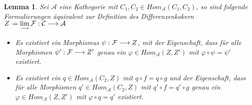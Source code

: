 \documentclass[10pt,a4paper]{report}
\newcounter{Aussage}[chapter]
\newtheorem{lemma}[Aussage]{Lemma}
\newcommand{\functionfront}[3]{\nolinebreak{#1:#2 \longrightarrow #3}}
\newcommand{\colimes}[0]{\lim\limits_{ \longrightarrow }}
\newcommand*{\defeq}{\mathrel{\vcenter{\baselineskip0.5ex \lineskiplimit0pt
                     \hbox{\scriptsize.}\hbox{\scriptsize.}}}%
                     =}
\begin{document}
\begin{lemma}\label{Differenzenkokerndef} Sei $\mathcal{A}$ eine Kathegorie mit $C_1,C_2 \in Hom_{\mathcal{A}}(C_1,C_2)$, so sind folgende Formulierungen äquivalent zur Definition des Differenzenkokern $Z \defeq \colimes \functionfront{\mathcal{F}}{\mathcal{C}}{\mathcal{A}}$
\begin{itemize}
\item[1.] Es existiert ein Morphismus $\functionfront{\psi}{\mathcal{F}}{Z}$, mit der Eigenschaft, dass für alle Morphismen $\functionfront{\psi '}{\mathcal{F}}{Z '}$ genau ein $\varphi \in Hom_{\mathcal{A}}(Z,Z')$ mit $\varphi \circ \psi = \psi '$ existiert.
\item[2.] Es existiert ein $q \in Hom_{\mathcal{A}}(C_2,Z)$ mit $q \circ f = q \circ g$ und der Eigenschaft, dass für alle Morphismen $q' \in Hom_{\mathcal{A}}(C_2,Z)$ mit $q' \circ f = q' \circ g$ genau ein $\varphi \in Hom_{\mathcal{A}}(Z,Z')$ mit $\varphi \circ q = q'$ existiert.
\begin{center}
\end{center}
\end{itemize}
\end{lemma}
\end{document}
